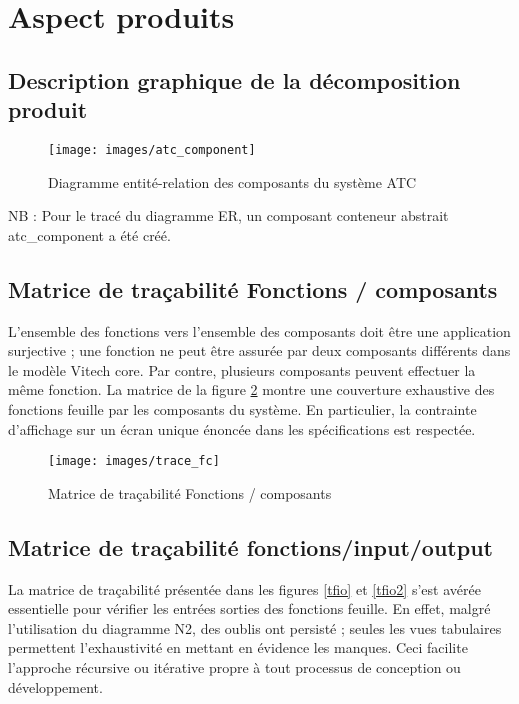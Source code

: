 
\section{Aspect produits }

\subsection{ Description graphique de la décomposition produit }
	\begin{figure}[H]
	\begin{center}	
		\texttt{[image: images/atc\_component]}
		\caption{Diagramme entité-relation des composants du système ATC}
		\label{prod}
	\end{center}
\end{figure}

NB : Pour le tracé du diagramme ER, un composant conteneur abstrait atc\_component a été créé.


\begin{landscape}	
	\subsection{ Matrice de traçabilité Fonctions / composants }
	
	
	L'ensemble des fonctions vers l'ensemble des composants doit être une application surjective ; une fonction ne peut être assurée par deux composants différents dans le modèle Vitech core. Par contre, plusieurs composants peuvent effectuer la même fonction. La matrice de la figure \ref{fc} montre une couverture exhaustive des fonctions feuille par les composants du système. En particulier, la contrainte d'affichage sur un écran unique énoncée dans les spécifications est respectée.
	
	\begin{figure}[H]
		\begin{center}	
			\texttt{[image: images/trace\_fc]}
			\caption{Matrice de traçabilité Fonctions / composants }
			\label{fc}
		\end{center}
	\end{figure}	

\end{landscape}


\subsection{ Matrice de traçabilité fonctions/input/output }
La matrice de traçabilité présentée dans les figures \ref{tfio} et \ref{tfio2} s'est avérée essentielle pour vérifier les entrées sorties des fonctions feuille.
En effet, malgré l'utilisation du diagramme N2, des oublis ont persisté ; seules les vues tabulaires permettent l'exhaustivité en mettant en évidence les manques. Ceci facilite l'approche récursive ou itérative propre à tout processus de conception ou développement. 

